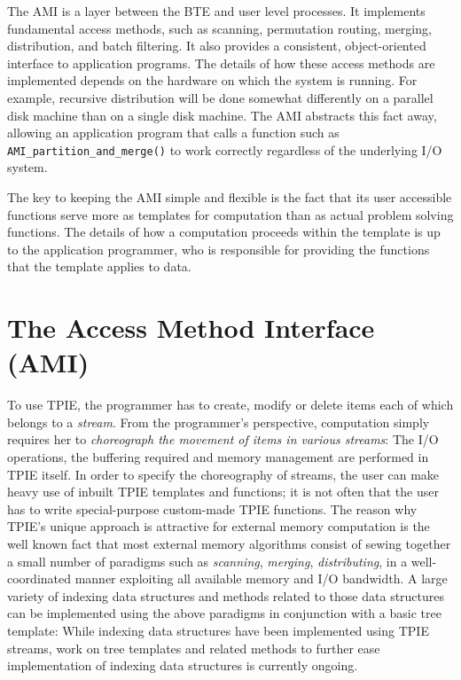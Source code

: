The AMI is a layer between the BTE and
user level processes.  It implements fundamental access methods, such
as scanning, permutation routing, merging, distribution, and batch
filtering. It also provides a consistent, object-oriented interface to
application programs.  The details of how these access methods are
implemented depends on the hardware on which the system is running.
For example, recursive distribution will be done somewhat differently
on a parallel disk machine than on a single disk machine.  The AMI
abstracts this fact away, allowing an application program that calls a
function such as
\verb|AMI_partition_and_merge()| to work correctly
regardless of the underlying I/O system.

The key to keeping the AMI simple and flexible is the fact that its
user accessible functions serve more as templates for computation than
as actual problem solving functions.  The details of how a computation
proceeds within the template is up to the application programmer, who
is responsible for providing the functions that the template applies
to data.

\section{The Access Method Interface (AMI)}
\label{sec:ref-ami}
To use TPIE, the programmer has to create, modify or delete items each of
which belongs to a \emph{stream}. From the programmer's perspective,
computation simply requires her to \emph{choreograph the movement of
items in various streams}: The I/O operations, the buffering required
and memory management are performed in TPIE itself. In order to specify
the choreography of streams, the user can make heavy use of inbuilt
TPIE templates and functions; it is not often that the user has to write
special-purpose custom-made TPIE functions. The reason why TPIE's unique
approach is attractive for external memory computation is the well
known fact that most external memory algorithms consist of sewing
together a small number of paradigms such as \emph{scanning},
\emph{merging}, \emph{distributing}, in a well-coordinated manner
exploiting all available memory and I/O bandwidth. A large variety of 
indexing data structures and methods related to those data structures 
can be implemented using the above paradigms in conjunction with a 
basic tree template: While indexing data structures have been
implemented using TPIE streams, work on tree templates and related
methods to further ease implementation of indexing data structures is
currently ongoing.

